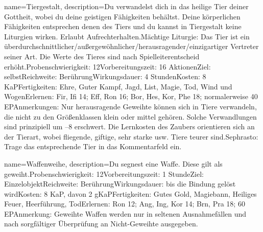 {
    name={Tiergestalt},
    description={Du verwandelst dich in das heilige Tier deiner Gottheit, wobei du deine geistigen Fähigkeiten behältst. Deine körperlichen Fähigkeiten entsprechen denen des Tiers und du kannst in Tiergestalt keine Liturgien wirken. Erlaubt Aufrechterhalten.\newline Mächtige Liturgie: Das Tier ist ein überdurchschnittlicher/außergewöhnlicher/herausragender/einzigartiger Vertreter seiner Art. Die Werte des Tieres sind nach Spielleiterentscheid erhöht.\newline Probenschwierigkeit: 12\newline Vorbereitungszeit: 16 Aktionen\newline Ziel: selbst\newline Reichweite: Berührung\newline Wirkungsdauer: 4 Stunden\newline Kosten: 8 KaP\newline Fertigkeiten: Ehre, Guter Kampf, Jagd, List, Magie, Tod, Wind und Wogen\newline Erlernen: Fir, Ifi 14; Eff, Ron 16; Bor, Hes, Kor, Phe 18; normalerweise 40 EP\newline Anmerkungen: Nur herausragende Geweihte können sich in Tiere verwandeln, die nicht zu den Größenklassen klein oder mittel gehören. Solche Verwandlungen sind prinzipiell um –8 erschwert. Die Lernkosten des Zaubers orientieren sich an der Tierart, wobei fliegende, giftige, sehr starke usw. Tiere teurer sind.\newline Sephrasto: Trage das entsprechende Tier in das Kommentarfeld ein.}
}


{
    name={Waffenweihe},
    description={Du segnest eine Waffe. Diese gilt als geweiht.\newline Probenschwierigkeit: 12\newline Vorbereitungszeit: 1 Stunde\newline Ziel: Einzelobjekt\newline Reichweite: Berührung\newline Wirkungsdauer: bis die Bindung gelöst wird\newline Kosten: 8 KaP, davon 2 gKaP\newline Fertigkeiten: Gutes Gold, Magiebann, Heiliges Feuer, Heerführung, Tod\newline Erlernen: Ron 12; Ang, Ing, Kor 14; Brn, Pra 18; 60 EP\newline Anmerkung: Geweihte Waffen werden nur in seltenen Ausnahmefällen und nach sorgfältiger Überprüfung an Nicht-Geweihte ausgegeben. }
}


